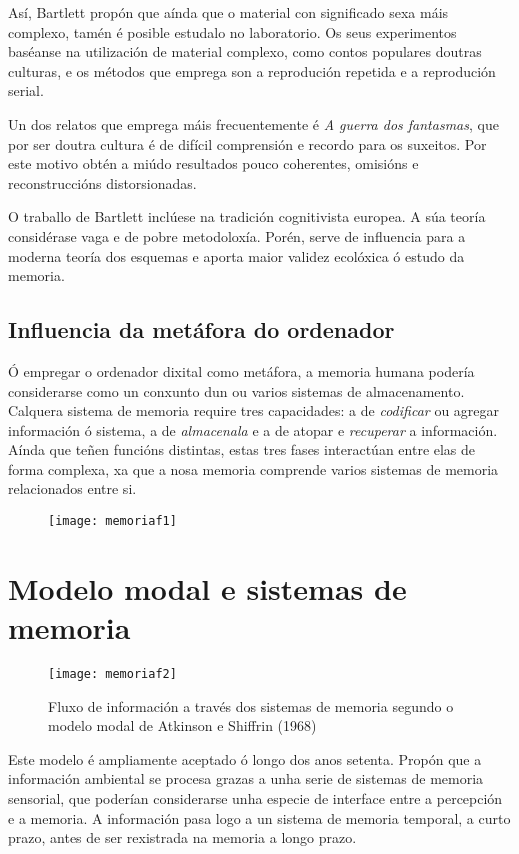 \documentclass[a4paper,11pt]{article}
\begin{document}
Así, Bartlett propón que aínda que o material con significado sexa máis complexo, tamén é posible estudalo no laboratorio. Os seus experimentos baséanse na utilización de material complexo, como contos populares doutras culturas, e os métodos que emprega son a reprodución repetida e a reprodución serial.

Un dos relatos que emprega máis frecuentemente é \textit{A guerra dos fantasmas}, que por ser doutra cultura é de difícil comprensión e recordo para os suxeitos. Por este motivo obtén a miúdo resultados pouco coherentes, omisións e reconstruccións distorsionadas.

O traballo de Bartlett inclúese na tradición cognitivista europea. A súa teoría considérase vaga e de pobre metodoloxía. Porén, serve de influencia para a moderna teoría dos esquemas e aporta maior validez ecolóxica ó estudo da memoria.

\subsection{Influencia da metáfora do ordenador}
Ó empregar o ordenador dixital como metáfora, a memoria humana podería considerarse como un conxunto dun ou varios sistemas de almacenamento. Calquera sistema de memoria require	tres capacidades: a de \textit{codificar} ou agregar información ó sistema, a de \textit{almacenala} e a de atopar e \textit{recuperar} a información. Aínda que teñen funcións distintas, estas tres fases interactúan entre elas de forma complexa, xa que a nosa memoria comprende varios sistemas de memoria relacionados entre si.

\begin{figure}[h!]
	\centering
	\texttt{[image: memoriaf1]}
\end{figure}

\section{Modelo modal e sistemas de memoria}
\begin{figure}[h!]
	\centering
	\texttt{[image: memoriaf2]}
	\caption{Fluxo de información a través dos sistemas de memoria segundo o modelo modal de Atkinson 	e Shiffrin (1968)}
\end{figure}

Este modelo é ampliamente aceptado ó longo dos anos setenta. Propón que a información ambiental se procesa grazas a unha serie de sistemas de memoria sensorial, que poderían considerarse unha especie de interface entre a percepción e a memoria. A información pasa logo a un sistema de memoria temporal, a curto prazo, antes de ser rexistrada na memoria a longo prazo.
\end{document}
